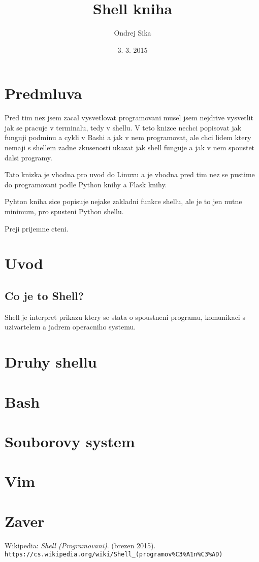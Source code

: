 \documentclass[12pt,a5paper]{article}
\title{Shell kniha}
\author{Ondrej Sika}
\date{3. 3. 2015}
\begin{document}


\section{Predmluva}

Pred tim nez jsem zacal vysvetlovat programovani musel jsem nejdrive vysvetlit jak se pracuje v terminalu, tedy v shellu. V teto knizce nechci popisovat jak funguji podminu a cykli v Bashi a jak v nem programovat, ale chci lidem ktery nemaji s shellem zadne zkusenosti ukazat jak shell funguje a jak v nem spoustet dalsi programy.

Tato knizka je vhodna pro uvod do Linuxu a je vhodna pred tim nez se pustime do programovani podle Python knihy a Flask knihy.

Pyhton kniha sice popisuje nejake zakladni funkce shellu, ale je to jen nutne minimum, pro spusteni Python shellu.

Preji prijemne cteni.


\section{Uvod}
\subsection{Co je to Shell?}

Shell je interpret prikazu ktery se stata o spoustneni programu, komunikaci s uzivartelem a jadrem operacniho systemu. \cite{wiki-shell}

\section{Druhy shellu}
\section{Bash}
\section{Souborovy system}
\section{Vim}
\section{Zaver}

\begin{thebibliography}{10}
   Wikipedia:
    \emph{Shell (Programovani)}. (brezen 2015).\\
    \lstinline|https://cs.wikipedia.org/wiki/Shell_(programov%C3%A1n%C3%AD)|
\end{thebibliography}
\end{document}
